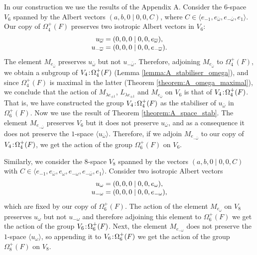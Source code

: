 In our construction we use the results of the Appendix A. Consider the \mbox{$6$-space} $V_6$ spanned by the Albert vectors
$(a,b,0\mid 0,0,C)$, where $C \in \langle e_{-1}, e_{\bar{\omega}}, e_{-\bar{\omega}}, 
e_1 \rangle$. Our copy of $\Omega_4^+(F)$ preserves two isotropic Albert vectors in
 $V_6$:
\begin{equation}
	\begin{array}{r@{\;}c@{\;}l}
		u_{\bar{\omega}} & = & (0,0,0\mid 0,0,e_{\bar{\omega}}), \\
		u_{-\bar{\omega}} & = & (0,0,0\mid 0,0,e_{-\bar{\omega}}). \\
	\end{array} 
\end{equation}
The element $M_{e_{\bar{\omega}}}$ preserves $u_{\bar{\omega}}$ but not $u_{-\bar{\omega}}$.
Therefore, adjoining $M_{e_{\bar{\omega}}}$ to $\Omega_4^+(F)$, 
we obtain a subgroup
of $V_4\mathord{{\;\!{:}\;\!}}\Omega_4^+(F)$ (Lemma \ref{lemma:A_stabiliser_omega}), and since 
$\Omega_4^+(F)$
is maximal in the latter (Theorem \ref{theorem:A_omega_maximal}), we conclude that the action of $M_{\lambda e_{\pm 1}}$, 
$L_{\lambda e_{\pm 1}}$ and $M_{e_{\bar{\omega}}}$ on $V_6$ is that of 
$V_4\mathord{{\;\!{:}\;\!}}\Omega_4^+(F)$. That is, we have constructed the group 
$V_4\mathord{{\;\!{:}\;\!}}\Omega_4^+(F)$
as the stabiliser of $u_{\bar{\omega}}$ in $\Omega_6^+(F)$. 
Now we use the result of Theorem \ref{theorem:A_space_stab}. The element
 $M_{e_{-\bar{\omega}}}$ preserves $V_6$ but it does not preserve
$u_{\bar{\omega}}$, and as a consequence it does not preserve the $1$-space $\langle
u_{\bar{\omega}} \rangle$. Therefore, if we adjoin $M_{e_{-\bar{\omega}}}$ to our copy of 
$V_4\mathord{{\;\!{:}\;\!}}\Omega_4^+(F)$, we get the action of the group $\Omega_6^+(F)$ on $V_6$. 

Similarly, we consider the $8$-space $V_8$ spanned by the vectors 
$(a,b,0\mid 0,0,C)$ with $C \in \langle e_{-1}, e_{\bar{\omega}}, e_{\omega}, 
e_{- \omega}, e_{-\bar{\omega}}, e_1 \rangle$. Consider two isotropic Albert vectors
\begin{equation}
	\begin{array}{r@{\;}c@{\;}l}
		u_{\omega} & = & (0,0,0 \mid 0,0,e_{\omega}), \\
		u_{-\omega} & = & (0,0,0 \mid 0,0,e_{-\omega}),
	\end{array}
\end{equation}
which are fixed by our copy of $\Omega_6^+(F)$. The action of the element
 $M_{e_{\omega}}$
on $V_8$ preserves $u_{\omega}$ but not $u_{-\omega}$ and therefore adjoining this element
to $\Omega_6^+(F)$ we get the action of the group $V_6\mathord{{\;\!{:}\;\!}}\Omega_6^+(F)$. Next, 
the element $M_{e_{-\omega}}$ does not preserve the $1$-space $\langle u_{\omega} \rangle$,
so appending it to $V_6\mathord{{\;\!{:}\;\!}}\Omega_6^+(F)$ we get the action of the group
$\Omega_8^+(F)$ on $V_8$. 

